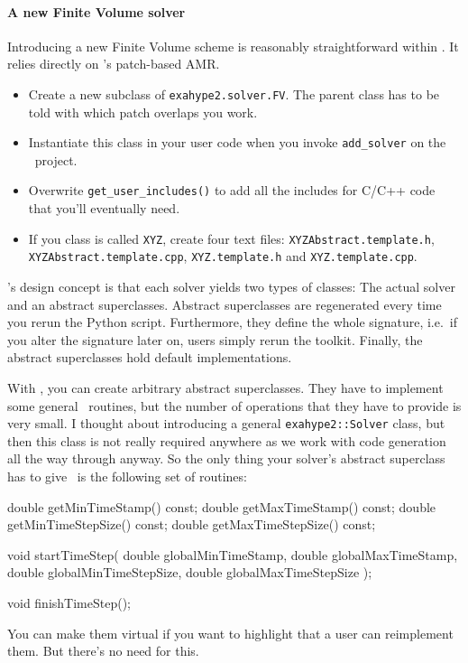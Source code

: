 \paragraph{A new Finite Volume solver}

Introducing a new Finite Volume scheme is reasonably straightforward within
\ExaHyPE.
It relies directly on \Peano's patch-based AMR.


\begin{itemize}
  \item Create a new subclass of \texttt{exahype2.solver.FV}. The parent class
  has to be told with which patch overlaps you work.
  \item Instantiate this class in your user code when you invoke
  \texttt{add\_solver} on the \ExaHyPE\ project.
  \item Overwrite \texttt{get\_user\_includes()} to add all the includes for
  C/C++ code that you'll eventually need. 
  \item If you class is called \texttt{XYZ}, create four text files:
  \texttt{XYZAbstract.template.h}, \linebreak \texttt{XYZAbstract.template.cpp},
  \texttt{XYZ.template.h} and \texttt{XYZ.template.cpp}.
\end{itemize}

\noindent
\ExaHyPE's design concept is that each solver yields two types of classes:
The actual solver and an abstract superclasses. 
Abstract superclasses are regenerated every time you rerun the Python script.
Furthermore, they define the whole signature, i.e.~if you alter the signature
later on, users simply rerun the toolkit. 
Finally, the abstract superclasses hold default implementations.


With \Peano, you can create arbitrary abstract superclasses. 
They have to implement some general \ExaHyPE\ routines, but the number of operations that they have to
provide is very small.
I thought about introducing a general \texttt{exahype2::Solver} class, but then
this class is not really required anywhere as we work with code generation all
the way through anyway. 
So the only thing your solver's abstract superclass has to give \ExaHyPE\ is the
following set of routines:

\begin{code}
  double getMinTimeStamp() const;
  double getMaxTimeStamp() const;
  double getMinTimeStepSize() const;
  double getMaxTimeStepSize() const;

  void startTimeStep(
      double globalMinTimeStamp,
      double globalMaxTimeStamp,
      double globalMinTimeStepSize,
      double globalMaxTimeStepSize
  );

  void finishTimeStep();
\end{code}
\noindent
You can make them virtual if you want to highlight that a user can reimplement
them. 
But there's no need for this. 


